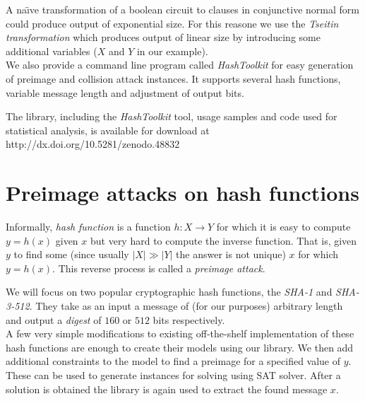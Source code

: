 \documentclass[myposter,portrait]{sciposter}
\def\mysection#1{
{\color{sectionCol}\section*{\sc\bfseries #1}}}
\begin{document}
\begin{multicols*}{3}
\begin{center}
  
\end{center}

A na\"{\i}ve transformation of a boolean circuit to clauses in conjunctive normal form could produce output of exponential size.
For this reasone we use the \emph{Tseitin transformation} \cite{tseitin1983complexity} which produces output of linear size by introducing some additional variables ($X$ and $Y$ in our example).
~\\

We also provide a command line program called \emph{HashToolkit} for easy generation of preimage and collision attack instances.
It supports several hash functions, variable message length and adjustment of output bits.
~\\

\vfill

\begin{minipage}[t][][b]{.59\columnwidth}
The library, including the \emph{HashToolkit} tool, usage samples and code used for statistical analysis, is available for download at http://dx.doi.org/10.5281/zenodo.48832
\end{minipage}
\begin{minipage}[t][][t]{.4\columnwidth}
\hfill {}
\end{minipage}

\columnbreak
\mysection{Preimage attacks on hash functions}
Informally, \emph{hash function} is a function $h: X \to Y$ for which it is easy to compute $y = h(x)$ given $x$ but very hard to compute the inverse function.
That is, given $y$ to find some (since usually $|X| \gg |Y|$ the answer is not unique) $x$ for which $y = h(x)$.
This reverse process is called a \emph{preimage attack}.

We will focus on two popular cryptographic hash functions, the \emph{SHA-1} and \emph{SHA-3-512}.
They take as an input a message of (for our purposes) arbitrary length and output a \emph{digest} of $160$ or $512$ bits respectively.
~\\

A few very simple modifications to existing off-the-shelf implementation of these hash functions are enough to create their models using our library.
We then add additional constraints to the model to find a preimage for a specified value of $y$.
These can be used to generate instances for solving using SAT solver.
After a solution is obtained the library is again used to extract the found message $x$.


\end{multicols*}
\end{document}
